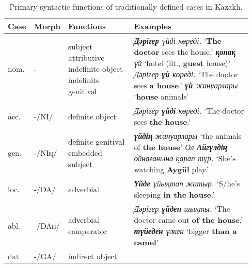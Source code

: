 \documentclass[a4paper,11pt, onecolumn,twoside]{article}
\newcommand{\kazakh}[1]{{\em #1}}
\newcommand{\gloss}[1]{`#1'}
\begin{document}
\begin{table}[htbp]
	\centering
	\caption{Primary syntactic functions of traditionally defined cases in Kazakh.}\label{tab:cases}
	\begin{small}
		\begin{tabular}{l l p{8em} p{27.15em}}
			\toprule
				\textbf{Case} & \textbf{Morph} & \textbf{Functions} & \textbf{Examples} \\
			\midrule
				nom. & - & subject\newline
										attributive\newline
										indefinite object\newline
										indefinite genitival 
									& \kazakh{\textbf{Дәрігер} үйді көреді.} \gloss{\textbf{The doctor} sees the house.} \newline
										\kazakh{\textbf{қонақ} үй} \gloss{hotel (lit., \textbf{guest} house)} \newline 
										\kazakh{Дәрігер \textbf{үй} көреді.} \gloss{The doctor sees \textbf{a house}.}\newline
										\kazakh{\textbf{үй} жануарлары} \gloss{\textbf{house} animals} \\\midrule
				acc. & -/NI/ & definite object %
										& \kazakh{Дәрігер \textbf{үйді} көреді.} \gloss{The doctor sees \textbf{the house}.}
										\\\midrule
				gen. & -/NIң/ & definite genitival\newline
											embedded subject
										& \kazakh{\textbf{үйдің} жануарлары} \gloss{the animals of \textbf{the house}} \newline
											\kazakh{Ол \textbf{Айгүлдің} ойнағанына қарап тұр.} \gloss{She's watching \textbf{Aygül} play.} \\\midrule
				loc. & -/DA/ & adverbial
										& \kazakh{\textbf{Үйде} ұйықтап жатыр.} \gloss{S/he's sleeping \textbf{in the house}.} \\\midrule
				abl. & -/DAн/ & adverbial\newline
											comparator 
										& \kazakh{Дәрігер \textbf{үйден} шықты.} \gloss{The doctor came out \textbf{of the house}.}\newline
											\kazakh{\textbf{түйеден} үлкен} \gloss{bigger \textbf{than a camel}}\\\midrule
				dat. & -/GA/ & indirect object\newline

\end{tabular}
\end{small}
\end{table}
\end{document}
